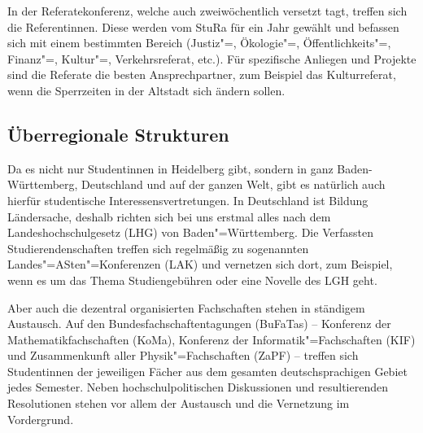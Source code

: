 In der Referatekonferenz, welche auch zweiwöchentlich versetzt tagt, treffen sich die Referentinnen. 
Diese werden vom StuRa für ein Jahr gewählt und befassen sich mit einem bestimmten Bereich (Justiz"=, Ökologie"=, Öffentlichkeits"=, Finanz"=, Kultur"=, Verkehrsreferat, etc.). 
Für spezifische Anliegen und Projekte sind die Referate die besten Ansprechpartner, zum Beispiel das Kulturreferat, wenn die Sperrzeiten in der Altstadt sich ändern sollen.

\subsection{Überregionale Strukturen}
Da es nicht nur Studentinnen in Heidelberg gibt, sondern in ganz Baden-Württemberg, Deutschland und auf der ganzen Welt, gibt es natürlich auch hierfür studentische Interessensvertretungen. 
In Deutschland ist Bildung Ländersache, deshalb richten sich bei uns erstmal alles nach dem Landeshochschulgesetz (LHG) von Baden"=Württemberg. 
Die Verfassten Studierendenschaften treffen sich regelmäßig zu sogenannten Landes"=ASten"=Konferenzen (LAK) und vernetzen sich dort, zum Beispiel, wenn es um das Thema Studiengebühren oder eine Novelle des LGH geht.

Aber auch die dezentral organisierten Fachschaften stehen in ständigem Austausch. 
Auf den Bundesfachschaftentagungen (BuFaTas) -- Konferenz der Mathematikfachschaften (KoMa), Konferenz der Informatik"=Fachschaften (KIF) und Zusammenkunft aller Physik"=Fachschaften (ZaPF) -- treffen sich Studentinnen der jeweiligen Fächer aus dem gesamten deutschsprachigen Gebiet jedes Semester. 
Neben hochschulpolitischen Diskussionen und resultierenden Resolutionen stehen vor allem der Austausch und die Vernetzung im Vordergrund.
